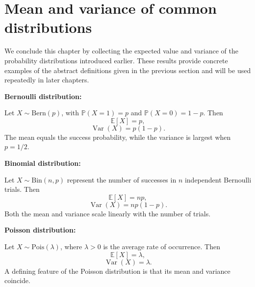 \section{Mean and variance of common distributions}

We conclude this chapter by collecting the expected value and variance of the probability distributions introduced earlier. These results provide concrete examples of the abstract definitions given in the previous section and will be used repeatedly in later chapters.

\medskip

\textbf{Bernoulli distribution:}

\medskip

Let $X\sim\mathrm{Bern}(p)$, with $\mathbb{P}(X=1)=p$ and $\mathbb{P}(X=0)=1-p$. Then
\begin{equation}
    \mathbb{E}[X]=p,
\end{equation}
\begin{equation}
    \operatorname{Var}(X)=p(1-p).
\end{equation}
The mean equals the success probability, while the variance is largest when $p=1/2$.

\medskip

\textbf{Binomial distribution:}

\medskip

Let $X\sim\mathrm{Bin}(n,p)$ represent the number of successes in $n$ independent Bernoulli trials. Then
\begin{equation}
    \mathbb{E}[X]=np,
\end{equation}
\begin{equation}
    \operatorname{Var}(X)=np(1-p).
\end{equation}
Both the mean and variance scale linearly with the number of trials.

\medskip

\textbf{Poisson distribution:}

\medskip

Let $X\sim\mathrm{Pois}(\lambda)$, where $\lambda>0$ is the average rate of occurrence. Then
\begin{equation}
    \mathbb{E}[X]=\lambda,
\end{equation}
\begin{equation}
    \operatorname{Var}(X)=\lambda.
\end{equation}
A defining feature of the Poisson distribution is that its mean and variance coincide.

